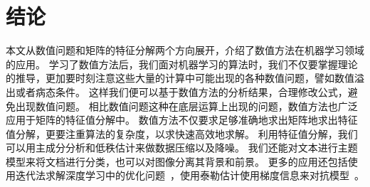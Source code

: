 \chapter{结论}
\label{chap:conclusion}

本文从数值问题和矩阵的特征分解两个方向展开，介绍了数值方法在机器学习领域的应用。
学习了数值方法后，我们面对机器学习的算法时，我们不仅要掌握理论的推导，更加要时刻注意这些大量的计算中可能出现的各种数值问题，譬如数值溢出或者病态条件。
这样我们便可以基于数值方法的分析结果，合理修改公式，避免出现数值问题。
相比数值问题这种在底层运算上出现的问题，数值方法也广泛应用于矩阵的特征值分解中。
数值方法不仅要求足够准确地求出矩阵地求出特征值分解，更要注重算法的复杂度，以求快速高效地求解。
利用特征值分解，我们可以用主成分分析和低秩估计来做数据压缩以及降噪。
我们还能对文本进行主题模型来将文档进行分类，也可以对图像分离其背景和前景。
更多的应用还包括使用迭代法求解深度学习中的优化问题~\cite{adam}，使用泰勒估计使用梯度信息来对抗模型~\cite{adversarial}。